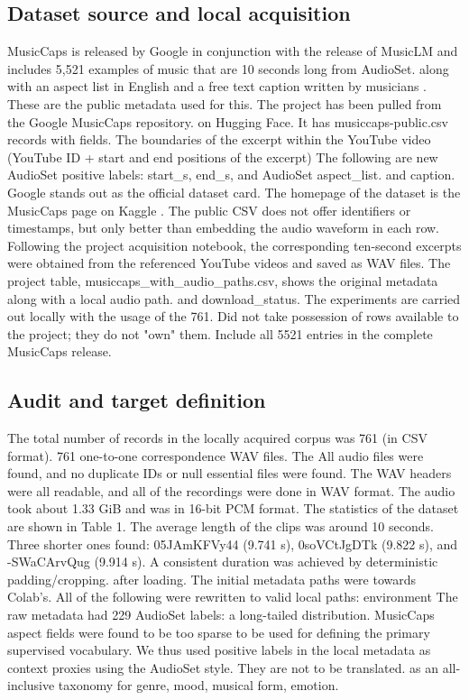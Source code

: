 \documentclass[10pt,twocolumn,letterpaper]{article}
\begin{document}
\subsection{Dataset source and local acquisition}
MusicCaps is released by Google in conjunction with the release of MusicLM and includes 5,521 examples of music that are 10 seconds long from AudioSet. along with an aspect list in English and a free text caption written by musicians \cite{agostinelli2023musiclm,googlemusiccaps}. These are the public metadata used for this. The project has been pulled from the Google MusicCaps repository. on Hugging Face. It has musiccaps-public.csv records with fields. The boundaries of the excerpt within the YouTube video (YouTube ID + start and end positions of the excerpt) The following are new AudioSet positive labels: start\_s, end\_s, and AudioSet aspect\_list. and caption. Google stands out as the official dataset card. The homepage of the dataset is the MusicCaps page on Kaggle \cite{googlemusiccaps}. The public CSV does not offer identifiers or timestamps, but only better than embedding the audio waveform in each row. Following the project acquisition notebook, the corresponding ten-second excerpts were obtained from the referenced YouTube videos and saved as WAV files. The project table, musiccaps\_with\_audio\_paths.csv, shows the original metadata along with a local audio path. and download\_status. The experiments are carried out locally with the usage of the 761. Did not take possession of rows available to the project; they do not "own" them. Include all 5521 entries in the complete MusicCaps release.

\subsection{Audit and target definition}
The total number of records in the locally acquired corpus was 761 (in CSV format). 761 one-to-one correspondence WAV files. The All audio files were found, and no duplicate IDs or null essential files were found. The WAV headers were all readable, and all of the recordings were done in WAV format. The audio took about 1.33 GiB and was in 16-bit PCM format. The statistics of the dataset are shown in Table 1. The average length of the clips was around 10 seconds. Three shorter ones found: 05JAmKFVy44 (9.741 s), 0soVCtJgDTk (9.822 s), and -SWaCArvQug (9.914 s). A consistent duration was achieved by deterministic padding/cropping. after loading. The initial metadata paths were towards Colab's. All of the following were rewritten to valid local paths: environment The raw metadata had 229 AudioSet labels: a long-tailed distribution. MusicCaps aspect fields were found to be too sparse to be used for defining the primary supervised vocabulary. We thus used positive labels in the local metadata as context proxies using the AudioSet style. They are not to be translated. as an all-inclusive taxonomy for genre, mood, musical form, emotion.
\end{document}
